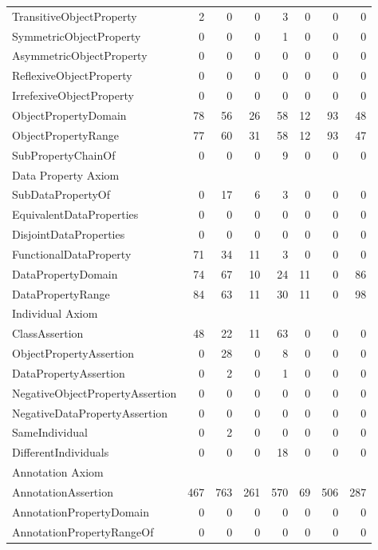 \begin{table}[!htb]
{\begin{tabular}{lrrrrrrr}
TransitiveObjectProperty & 2 & 0 & 0 & 3 & 0 & 0 & 0 \\
SymmetricObjectProperty & 0 & 0 & 0 & 1 & 0 & 0 & 0 \\
AsymmetricObjectProperty & 0 & 0 & 0 & 0 & 0 & 0 & 0 \\
ReflexiveObjectProperty & 0 & 0 & 0 & 0 & 0 & 0 & 0 \\
IrrefexiveObjectProperty & 0 & 0 & 0 & 0 & 0 & 0 & 0 \\
ObjectPropertyDomain & 78 & 56 & 26 & 58 & 12 & 93 & 48 \\
ObjectPropertyRange & 77 & 60 & 31 & 58 & 12 & 93 & 47 \\
SubPropertyChainOf & 0 & 0 & 0 & 9 & 0 & 0 & 0 \\
Data Property Axiom &  &  &  &  &  &  &  \\
SubDataPropertyOf & 0 & 17 & 6 & 3 & 0 & 0 & 0 \\
EquivalentDataProperties & 0 & 0 & 0 & 0 & 0 & 0 & 0 \\
DisjointDataProperties & 0 & 0 & 0 & 0 & 0 & 0 & 0 \\
FunctionalDataProperty & 71 & 34 & 11 & 3 & 0 & 0 & 0 \\
DataPropertyDomain & 74 & 67 & 10 & 24 & 11 & 0 & 86 \\
DataPropertyRange & 84 & 63 & 11 & 30 & 11 & 0 & 98 \\
Individual Axiom &  &  &  &  &  &  &  \\
ClassAssertion & 48 & 22 & 11 & 63 & 0 & 0 & 0 \\
ObjectPropertyAssertion & 0 & 28 & 0 & 8 & 0 & 0 & 0 \\
DataPropertyAssertion & 0 & 2 & 0 & 1 & 0 & 0 & 0 \\
NegativeObjectPropertyAssertion & 0 & 0 & 0 & 0 & 0 & 0 & 0 \\
NegativeDataPropertyAssertion & 0 & 0 & 0 & 0 & 0 & 0 & 0 \\
SameIndividual & 0 & 2 & 0 & 0 & 0 & 0 & 0 \\
DifferentIndividuals & 0 & 0 & 0 & 18 & 0 & 0 & 0 \\
Annotation Axiom &  &  &  &  &  &  &  \\
AnnotationAssertion & 467 & 763 & 261 & 570 & 69 & 506 & 287 \\
AnnotationPropertyDomain & 0 & 0 & 0 & 0 & 0 & 0 & 0 \\
AnnotationPropertyRangeOf & 0 & 0 & 0 & 0 & 0 & 0 & 0
\end{tabular}%
}
\end{table}